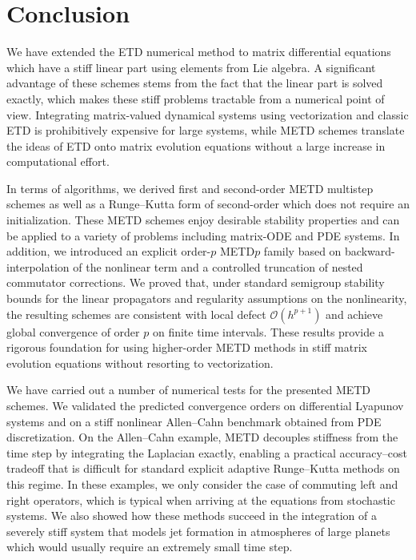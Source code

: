\documentclass[12pt]{article}
\begin{document}
\section{Conclusion}

We have extended the ETD numerical method to matrix differential equations which have a stiff linear part using elements from Lie algebra. A significant advantage of these schemes stems from the fact that the linear part is solved exactly, which makes these stiff problems tractable from a numerical point of view. Integrating matrix-valued dynamical systems using vectorization and classic ETD is prohibitively expensive for large systems, while METD schemes translate the ideas of ETD onto matrix evolution equations without a large increase in computational effort.

In terms of algorithms, we derived first and second-order METD multistep schemes as well as a Runge–Kutta form of second-order which does not require an initialization. These METD schemes enjoy desirable stability properties and can be applied to a variety of problems including matrix-ODE and PDE systems. In addition, we introduced an explicit order-$p$ METD$p$ family based on backward-interpolation of the nonlinear term and a controlled truncation of nested commutator corrections. We proved that, under standard semigroup stability bounds for the linear propagators and regularity assumptions on the nonlinearity, the resulting schemes are consistent with local defect $\mathcal{O}(h^{p+1})$ and achieve global convergence of order $p$ on finite time intervals. These results provide a rigorous foundation for using higher-order METD methods in stiff matrix evolution equations without resorting to vectorization.

We have carried out a number of numerical tests for the presented METD schemes. We validated the predicted convergence orders on differential Lyapunov systems and on a stiff nonlinear Allen–Cahn benchmark obtained from PDE discretization. On the Allen–Cahn example, METD decouples stiffness from the time step by integrating the Laplacian exactly, enabling a practical accuracy–cost tradeoff that is difficult for standard explicit adaptive Runge–Kutta methods on this regime. In these examples, we only consider the case of commuting left and right operators, which is typical when arriving at the equations from stochastic systems. We also showed how these methods succeed in the integration of a severely stiff system that models jet formation in atmospheres of large planets which would usually require an extremely small time step.
\end{document}
